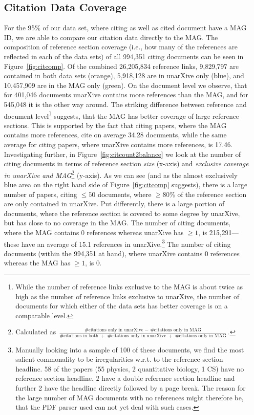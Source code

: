 \subsection{Citation Data Coverage}
For the 95\% of our data set, where citing as well as cited document have a MAG ID, we are able to compare our citation data directly to the MAG. The composition of reference section coverage (i.e., how many of the references are reflected in each of the data sets) of all 994,351 citing documents can be seen in Figure~\ref{fig:citcomp}.  Of the combined 26,205,834 reference links, 9,829,797 are contained in both data sets (orange), 5,918,128 are in unarXive only (blue), and 10,457,909 are in the MAG only (green). On the document level we observe, that for 401,046 documents unarXive contains more references than the MAG, and for 545,048 it is the other way around. The striking difference between reference and document level\footnote{While the number of reference links exclusive to the MAG is about twice as high as the number of reference links exclusive to unarXive, the number of documents for which either of the data sets has better coverage is on a comparable level.} suggests, that the MAG has better coverage of large reference sections. This is supported by the fact that citing papers, where the MAG contains more references, cite on average 34.28 documents, while the same average for citing papers, where unarXive contains more references, is 17.46. Investigating further, in Figure~\ref{fig:citcount2balance} we look at the number of citing documents in terms of reference section \emph{size} (x-axis) and \emph{exclusive coverage in unarXive and MAG}\footnote{Calculated as $\frac{\text{\#citations only in unarXive }-\text{ \#citations only in MAG}}{\text{\#citations in both }+\text{ \#citations only in unarXive }+\text{ \#citations only in MAG}}$.} (y-axis). As we can see (and as the almost exclusively blue area on the right hand side of Figure~\ref{fig:citcomp} suggests), there is a large number of papers, citing $\leq 50$ documents, where $\geq 80\%$ of the reference section are only contained in unarXive. Put differently, there is a large portion of documents, where the reference section is covered to some degree by unarXive, but has close to no coverage in the MAG. The number of citing documents, where the MAG contains $0$ references whereas unarXive has $\ge 1$, is 215,291---these have an average of 15.1 references in unarXive.\footnote{Manually looking into a sample of 100 of these documents, we find the most salient commonality to be irregularities w.r.t. to the reference section headline. 58 of the papers (55 physics, 2 quantitative biology, 1 CS) have no reference section headline, 2 have a double reference section headline and further 2 have the headline directly followed by a page break. The reason for the large number of MAG documents with no references might therefore be, that the PDF parser used can not yet deal with such cases.} The number of citing documents (within the 994,351 at hand), where unarXive contains $0$ references whereas the MAG has $\ge 1$, is 0.

